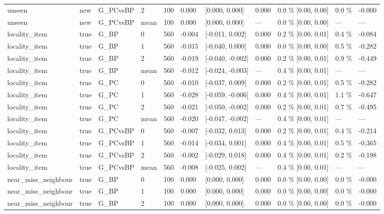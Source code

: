 \documentclass[10pt,a4paper]{article}
\begin{document}
\begin{center}
\begin{tabularx}{\textwidth}{@{}p{}XXXXXXXXXX@{}}
unseen & new & G\_PCvsBP & 2 & 100 & 0.000 & [0.000, 0.000] & 0.000 & 0.0 \% [0.00, 0.00] & 0.0 \% & -0.000 \\
unseen & new & G\_PCvsBP & mean & 100 & 0.000 & [0.000, 0.000] & — & 0.0 \% [0.00, 0.00] & — & — \\
locality\_item & true & G\_BP & 0 & 560 & -0.004 & [-0.011, 0.002] & 0.000 & 0.2 \% [0.00, 0.01] & 0.4 \% & -0.084 \\
locality\_item & true & G\_BP & 1 & 560 & -0.015 & [-0.040, 0.000] & 0.000 & 0.0 \% [0.00, 0.00] & 0.5 \% & -0.282 \\
locality\_item & true & G\_BP & 2 & 560 & -0.019 & [-0.040, -0.002] & 0.000 & 0.2 \% [0.00, 0.01] & 0.9 \% & -0.449 \\
locality\_item & true & G\_BP & mean & 560 & -0.012 & [-0.024, -0.003] & — & 0.4 \% [0.00, 0.01] & — & — \\
locality\_item & true & G\_PC & 0 & 560 & -0.010 & [-0.037, 0.009] & 0.000 & 0.2 \% [0.00, 0.01] & 0.5 \% & -0.282 \\
locality\_item & true & G\_PC & 1 & 560 & -0.028 & [-0.059, -0.006] & 0.000 & 0.4 \% [0.00, 0.01] & 1.1 \% & -0.647 \\
locality\_item & true & G\_PC & 2 & 560 & -0.021 & [-0.050, -0.002] & 0.000 & 0.2 \% [0.00, 0.01] & 0.7 \% & -0.495 \\
locality\_item & true & G\_PC & mean & 560 & -0.020 & [-0.047, -0.002] & — & 0.4 \% [0.00, 0.01] & — & — \\
locality\_item & true & G\_PCvsBP & 0 & 560 & -0.007 & [-0.032, 0.013] & 0.000 & 0.2 \% [0.00, 0.01] & 0.4 \% & -0.214 \\
locality\_item & true & G\_PCvsBP & 1 & 560 & -0.014 & [-0.034, 0.001] & 0.000 & 0.4 \% [0.00, 0.01] & 0.5 \% & -0.365 \\
locality\_item & true & G\_PCvsBP & 2 & 560 & -0.002 & [-0.029, 0.018] & 0.000 & 0.4 \% [0.00, 0.01] & 0.2 \% & -0.198 \\
locality\_item & true & G\_PCvsBP & mean & 560 & -0.008 & [-0.025, 0.002] & — & 0.4 \% [0.00, 0.01] & — & — \\
near\_miss\_neighbour & true & G\_BP & 0 & 100 & 0.000 & [0.000, 0.000] & 0.000 & 0.0 \% [0.00, 0.00] & 0.0 \% & -0.000 \\
near\_miss\_neighbour & true & G\_BP & 1 & 100 & 0.000 & [0.000, 0.000] & 0.000 & 0.0 \% [0.00, 0.00] & 0.0 \% & -0.000 \\
near\_miss\_neighbour & true & G\_BP & 2 & 100 & 0.000 & [0.000, 0.000] & 0.000 & 0.0 \% [0.00, 0.00] & 0.0 \% & -0.000 \\

\end{tabularx}
\end{center}
\end{document}
